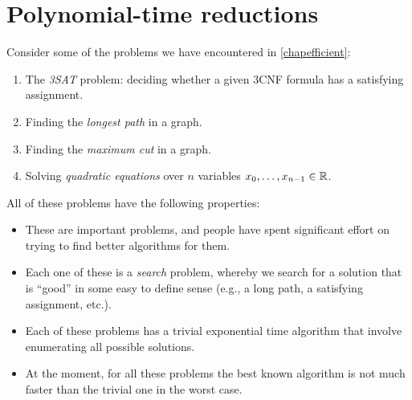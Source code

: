 \chapter{Polynomial-time reductions}\label{reductionchap}


Consider some of the problems we have encountered in
\cref{chapefficient}:

\begin{enumerate}
\def\labelenumi{\arabic{enumi}.}
\item
  The \emph{3SAT} problem: deciding whether a given 3CNF formula has a
  satisfying assignment.
\item
  Finding the \emph{longest path} in a graph.
\item
  Finding the \emph{maximum cut} in a graph.
\item
  Solving \emph{quadratic equations} over \(n\) variables
  \(x_0,\ldots,x_{n-1} \in {\mathbb{R}}\).
\end{enumerate}

All of these problems have the following properties:

\begin{itemize}
\item
  These are important problems, and people have spent significant effort
  on trying to find better algorithms for them.
\item
  Each one of these is a \emph{search} problem, whereby we search for a
  solution that is ``good'' in some easy to define sense (e.g., a long
  path, a satisfying assignment, etc.).
\item
  Each of these problems has a trivial exponential time algorithm that
  involve enumerating all possible solutions.
\item
  At the moment, for all these problems the best known algorithm is not
  much faster than the trivial one in the worst case.
\end{itemize}


